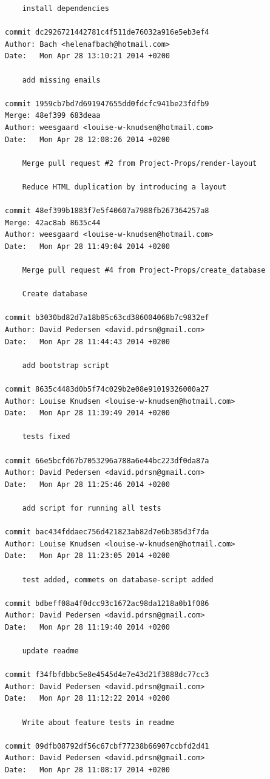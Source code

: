 \documentclass[12pt]{article}
\begin{document}
\begin{verbatim}
    install dependencies

commit dc2926721442781c4f511de76032a916e5eb3ef4
Author: Bach <helenafbach@hotmail.com>
Date:   Mon Apr 28 13:10:21 2014 +0200

    add missing emails

commit 1959cb7bd7d691947655dd0fdcfc941be23fdfb9
Merge: 48ef399 683deaa
Author: weesgaard <louise-w-knudsen@hotmail.com>
Date:   Mon Apr 28 12:08:26 2014 +0200

    Merge pull request #2 from Project-Props/render-layout
    
    Reduce HTML duplication by introducing a layout

commit 48ef399b1883f7e5f40607a7988fb267364257a8
Merge: 42ac8ab 8635c44
Author: weesgaard <louise-w-knudsen@hotmail.com>
Date:   Mon Apr 28 11:49:04 2014 +0200

    Merge pull request #4 from Project-Props/create_database
    
    Create database

commit b3030bd82d7a18b85c63cd386004068b7c9832ef
Author: David Pedersen <david.pdrsn@gmail.com>
Date:   Mon Apr 28 11:44:43 2014 +0200

    add bootstrap script

commit 8635c4483d0b5f74c029b2e08e91019326000a27
Author: Louise Knudsen <louise-w-knudsen@hotmail.com>
Date:   Mon Apr 28 11:39:49 2014 +0200

    tests fixed

commit 66e5bcfd67b7053296a788a6e44bc223df0da87a
Author: David Pedersen <david.pdrsn@gmail.com>
Date:   Mon Apr 28 11:25:46 2014 +0200

    add script for running all tests

commit bac434fddaec756d421823ab82d7e6b385d3f7da
Author: Louise Knudsen <louise-w-knudsen@hotmail.com>
Date:   Mon Apr 28 11:23:05 2014 +0200

    test added, commets on database-script added

commit bdbeff08a4f0dcc93c1672ac98da1218a0b1f086
Author: David Pedersen <david.pdrsn@gmail.com>
Date:   Mon Apr 28 11:19:40 2014 +0200

    update readme

commit f34fbfdbbc5e8e4545d4e7e43d21f3888dc77cc3
Author: David Pedersen <david.pdrsn@gmail.com>
Date:   Mon Apr 28 11:12:22 2014 +0200

    Write about feature tests in readme

commit 09dfb08792df56c67cbf77238b66907ccbfd2d41
Author: David Pedersen <david.pdrsn@gmail.com>
Date:   Mon Apr 28 11:08:17 2014 +0200


\end{verbatim}
\end{document}
